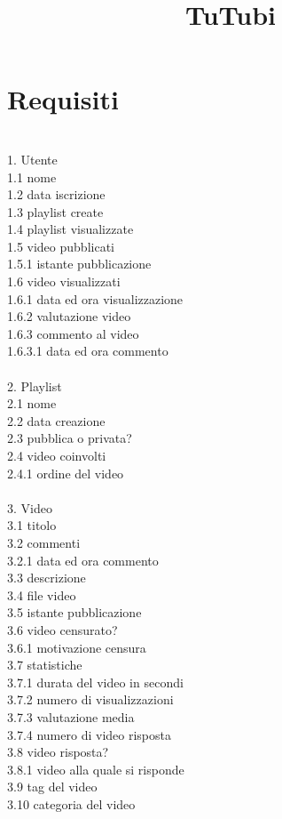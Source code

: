 \documentclass[12pt, letterpaper]{article}
\title{\textbf{TuTubi}}
\date{}
\newcommand{\acc}{\\\hphantom{}\\}
\newcommand{\id}{{\hphantom{ident}}}
\begin{document}
\maketitle\section{Requisiti}
\hphantom{a}\\
1. Utente \\ 
\id 1.1 nome \\
\id 1.2 data iscrizione \\
\id 1.3 playlist create \\
\id 1.4 playlist visualizzate \\
\id 1.5 video pubblicati\\ 
\id \id 1.5.1 istante pubblicazione\\ 
\id 1.6 video visualizzati \\
\id \id 1.6.1 data ed ora visualizzazione \\
\id \id 1.6.2 valutazione video \\
\id \id 1.6.3 commento al video\\ 
\id \id \id 1.6.3.1 data ed ora commento \acc
2. Playlist \\
\id 2.1 nome \\
\id 2.2 data creazione \\
\id 2.3 pubblica o privata? \\
\id 2.4 video coinvolti \\
\id \id 2.4.1 ordine del video \acc 
3. Video \\ 
\id 3.1 titolo \\
\id 3.2 commenti \\
\id \id 3.2.1 data ed ora commento \\
\id 3.3 descrizione \\ 
\id 3.4 file video \\
\id 3.5 istante pubblicazione \\
\id 3.6 video censurato? \\
\id \id 3.6.1 motivazione censura\\
\id 3.7 statistiche \\ 
\id \id 3.7.1 durata del video in secondi \\
\id \id 3.7.2 numero di visualizzazioni \\
\id \id 3.7.3 valutazione media \\
\id \id 3.7.4 numero di video risposta\\
\id 3.8 video risposta? \\ 
\id \id 3.8.1 video alla quale si risponde \\
\id 3.9 tag del video \\
\id 3.10 categoria del video\\
\end{document}
